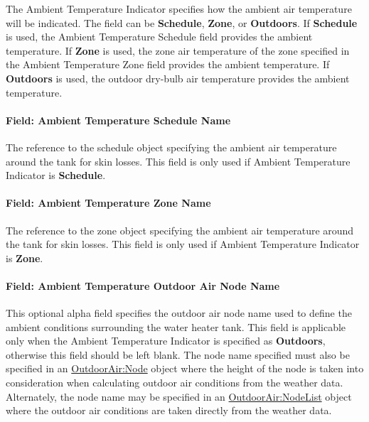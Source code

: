 The Ambient Temperature Indicator specifies how the ambient air temperature will be indicated. The field can be \textbf{Schedule}, \textbf{Zone}, or \textbf{Outdoors}. If \textbf{Schedule} is used, the Ambient Temperature Schedule field provides the ambient temperature. If \textbf{Zone} is used, the zone air temperature of the zone specified in the Ambient Temperature Zone field provides the ambient temperature. If \textbf{Outdoors} is used, the outdoor dry-bulb air temperature provides the ambient temperature.

\paragraph{Field: Ambient Temperature Schedule Name}\label{field-ambient-temperature-schedule-name-001}

The reference to the schedule object specifying the ambient air temperature around the tank for skin losses. This field is only used if Ambient Temperature Indicator is \textbf{Schedule}.

\paragraph{Field: Ambient Temperature Zone Name}\label{field-ambient-temperature-zone-name-001}

The reference to the zone object specifying the ambient air temperature around the tank for skin losses. This field is only used if Ambient Temperature Indicator is \textbf{Zone}.

\paragraph{Field: Ambient Temperature Outdoor Air Node Name}\label{field-ambient-temperature-outdoor-air-node-name-000}

This optional alpha field specifies the outdoor air node name used to define the ambient conditions surrounding the water heater tank. This field is applicable only when the Ambient Temperature Indicator is specified as \textbf{Outdoors}, otherwise this field should be left blank. The node name specified must also be specified in an \hyperref[outdoorairnode]{OutdoorAir:Node} object where the height of the node is taken into consideration when calculating outdoor air conditions from the weather data. Alternately, the node name may be specified in an \hyperref[outdoorairnodelist]{OutdoorAir:NodeList} object where the outdoor air conditions are taken directly from the weather data.

